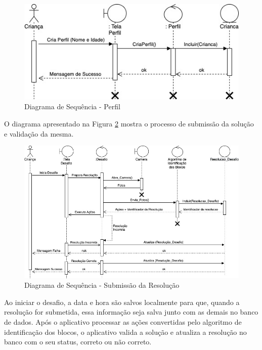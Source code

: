         \begin{figure}[H]
            \caption{Diagrama de Sequência - Perfil}
            \begin{center}
                \includegraphics[width=\linewidth]{Imagens/cap3/Sequencia_Perfil.jpg}
            \end{center}
            \label{figura:sequencia_perfil}
        \end{figure}
        
        
        O diagrama apresentado na Figura \ref{figura:sequencia_jogo} mostra o processo de submissão da solução e validação da mesma.
        
        \begin{figure}[H]
            \caption{Diagrama de Sequência - Submissão da Resolução}
            \begin{center}
                \includegraphics[width=\linewidth]{Imagens/cap3/Sequencia_Jogo.jpg}
            \end{center}
            \label{figura:sequencia_jogo}
        \end{figure}
        
        Ao iniciar o desafio, a data e hora são salvos localmente para que, quando a resolução for submetida, essa informação seja salva junto com as demais no banco de dados.
        Após o aplicativo processar as ações convertidas pelo algoritmo de identificação dos blocos, o aplicativo valida a solução e atualiza a resolução no banco com o seu status, correto ou não correto.